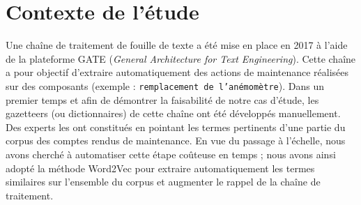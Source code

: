 \section{Contexte de l'étude}
Une chaîne de traitement de fouille de texte a été mise en place en 2017 à l’aide de la plateforme GATE (\textit{General Architecture for Text Engineering}). Cette chaîne a pour objectif d’extraire automatiquement des actions de maintenance réalisées sur des composants (exemple : \texttt{remplacement de l’anémomètre}). Dans un premier temps et afin de démontrer la faisabilité de notre cas d’étude, les gazetteers (ou dictionnaires) de cette chaîne ont été développés manuellement. Des experts les ont constitués en pointant les termes pertinents d’une partie du corpus des comptes rendus de maintenance. En vue du passage à l’échelle, nous avons cherché à automatiser cette étape coûteuse en temps ; nous avons ainsi adopté la méthode Word2Vec pour extraire automatiquement les termes similaires sur l’ensemble du corpus et augmenter le rappel de la chaîne de traitement.
